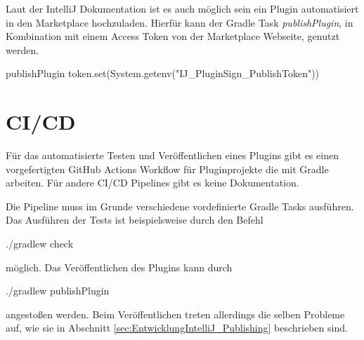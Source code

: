 Laut der IntelliJ Dokumentation ist es auch möglich sein ein
Plugin automatisiert in den Marketplace hochzuladen. Hierfür
kann der Gradle Task \emph{publishPlugin}, in Kombination
mit einem Access Token von der Marketplace Webseite, genutzt werden.
\begin{JsCode}[numbers=none]
    publishPlugin {
        token.set(System.getenv("IJ_PluginSign_PublishToken"))
    }
\end{JsCode}

\section{CI/CD}
\label{sec:EntwicklungIntelliJ_CICD}

Für das automatisierte Testen und Veröffentlichen eines Plugins
gibt es einen vorgefertigten GitHub Actions Workflow für 
Pluginprojekte die mit Gradle arbeiten. %
Für andere CI/CD Pipelines gibt es keine Dokumentation.

Die Pipeline muss im Grunde verschiedene vordefinierte Gradle Tasks
ausführen. Das Ausführen der Tests ist beispielsweise durch den Befehl
\begin{GenericCode}[numbers=none]
    ./gradlew check
\end{GenericCode}
möglich. Das Veröffentlichen des Plugins kann durch
\begin{GenericCode}[numbers=none]
    ./gradlew publishPlugin 
\end{GenericCode}
angestoßen werden. Beim Veröffentlichen treten allerdings die
selben Probleme auf, wie sie in Abschnitt \ref{sec:EntwicklungIntelliJ_Publishing}
beschrieben sind.